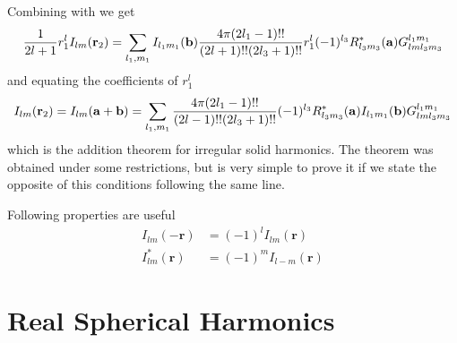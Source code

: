 \par{Combining  with  we get}
\begin{equation}
\frac{1}{2l+1}r_1^lI_{lm}({\bf r}_2)=\sum_{l_1,m_1}I_{l_1m_1}({{\bf b}})\frac{4\pi(2l_1-1)!!}{(2l+1)!!(2l_3+1)!!}r_1^{l}(-1)^{l_3}R_{l_3m_3}^{*}({\bf a})G_{lml_3m_3}^{l_1m_1}
\end{equation}
and equating the coefficients of ${r}_1^{l}$
\begin{equation*}
I_{lm}({\bf r}_2)=I_{lm}({\bf a}+{\bf b})=\sum_{l_1,m_1}\frac{4\pi(2l_1-1)!!}{(2l-1)!!(2l_3+1)!!}(-1)^{l_3}R_{l_3m_3}^{*}({\bf a})I_{l_1m_1}({{\bf b}})G_{lml_3m_3}^{l_1m_1}
\end{equation*}
which is the addition theorem for irregular solid harmonics. The theorem was
obtained under some restrictions, but is very simple to prove it if we state the
opposite of this conditions following the same line.
\par{Following properties are useful}
\begin{equation}
\begin{split}
I_{lm}(-\bm{r})&=(-1)^lI_{lm}(\bm{r})\\
I_{lm}^{*}(\bm{r})&=(-1)^mI_{l-m}(\bm{r})
\end{split}
\end{equation} 
\section{Real Spherical Harmonics}
